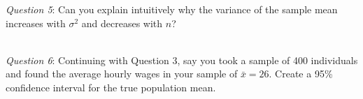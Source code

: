 \documentclass{./../../Latex/handout}
\begin{document}
\textit{Question 5}: Can you explain intuitively why the variance of the sample mean increases with $\sigma^2$ and decreases with $n$?

\newpage
{} \\

\textit{Question 6}: Continuing with Question 3, say you took a sample of 400 individuals and found the average hourly wages in your sample of $\bar{x} = 26$. Create a 95\% confidence interval for the true population mean. 
\end{document}
